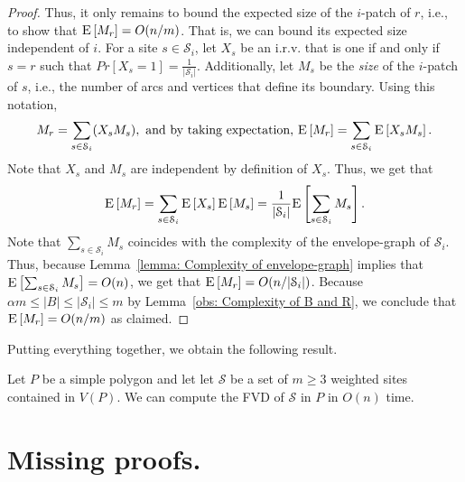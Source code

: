 \documentclass[a4paper,UKenglish]{socg-lipics-v2018}
\newcommand{\icell}[1][i]{${#1}$-patch\xspace}
\newcommand{\s}{\mathcal S}
\newcommand{\ex}[1]{\textsc{E}\left[#1\right]}
\begin{document}
\begin{proof}
Thus, it only remains to bound the expected size of the \icell of $r$, i.e., to show that $\ex{M_r} = O(n/m)$.
That is, we can bound its expected size independent of $i$.
For a site $s\in \s_i$, let $X_s$ be an i.r.v. that is one if and only if $s = r$ such that $Pr[X_s = 1] = \frac{1}{|\s_i|}$.
Additionally, let $M_s$ be the \emph{size} of the \icell of $s$, i.e., the number of arcs and vertices that define its boundary. 
Using this notation,
\[M_r = \sum_{s\in \s_i} ( X_s M_s), \text{ and by taking expectation, } \ex{M_r} = \sum_{s\in \s_i} \ex{X_s M_s}.\]
Note that $X_s$ and $M_s$ are independent by definition of $X_s$.
Thus, we get that  
\[\ex{M_r} = \sum_{s\in \s_i} \ex{X_s} \ex{M_s} = \frac{1}{|\s_i|} \ex{\sum_{s\in \s_i} M_s}.\]
Note that $\sum_{s\in \s_i} M_s$ coincides with the complexity of the envelope-graph of $\s_i$.
Thus, because Lemma~\ref{lemma: Complexity of envelope-graph} implies that $\ex{\sum_{s\in \s_i} M_s} = O(n)$, we get that  $\ex{M_r} = O(n/|\s_i|)$.
Because $\alpha m \leq |B| \leq |\s_i| \leq m$ by Lemma~\ref{obs: Complexity of B and R}, we conclude that $\ex{M_r} = O(n/m)$ as claimed.
\end{proof}

Putting everything together, we obtain the following result.

\begin{theorem}
Let  $P$ be a simple polygon and let let $\s$ be a set of $m\geq 3$ weighted sites contained in $V(P)$.
We can compute the FVD of $\s$ in $P$ in $O(n)$ time. 
\end{theorem}


{\small

}

\newpage 
\appendix
\section{Missing proofs.}
\setcounter{theorem}{6}
\ProofApexFVD
\setcounter{theorem}{9}
\ProofPropertiesOfQ
\setcounter{theorem}{12}
\ProofDistanceCoincideCell
\setcounter{theorem}{13}
\ProofShadowPoints
\setcounter{theorem}{15}
\ProofPatchContainsVcell
\setcounter{theorem}{16}
\ProofStructureEnvelope
\setcounter{theorem}{17}
\ProofPatchInGr
\setcounter{theorem}{19}
\ProofComplexityEnvelope
\end{document}
